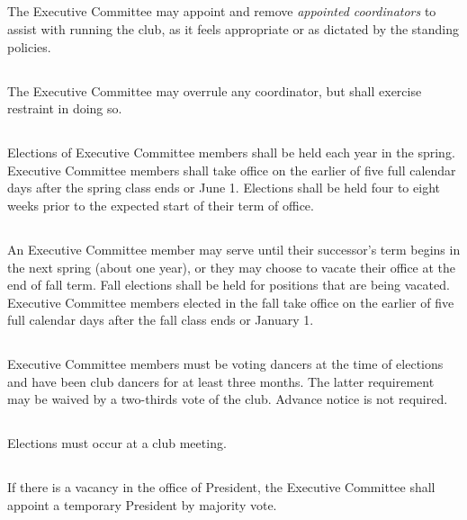 \documentclass{bylaws}
\begin{document}
\subsection{}The Executive Committee may appoint and remove \textit{appointed coordinators} to assist with running the club, as it feels appropriate or as dictated by the standing policies.
\subsection{}The Executive Committee may overrule any coordinator, but shall exercise restraint in doing so.



\subsection{}Elections of Executive Committee members shall be held each year in the spring. Executive Committee members shall take office on the earlier of five full calendar days after the spring class ends or June 1. Elections shall be held four to eight weeks prior to the expected start of their term of office.
\subsection{}An Executive Committee member may serve until their successor's term begins in the next spring (about one year), or they may choose to vacate their office at the end of fall term. Fall elections shall be held for positions that are being vacated. Executive Committee members elected in the fall take office on the earlier of five full calendar days after the fall class ends or January 1.
\subsection{}Executive Committee members must be voting dancers at the time of elections and have been club dancers for at least three months. The latter requirement may be waived by a two-thirds vote of the club. Advance notice is not required.
\subsection{}Elections must occur at a club meeting.

\subsection{}If there is a vacancy in the office of President, the Executive Committee shall appoint a temporary President by majority vote.
\end{document}
